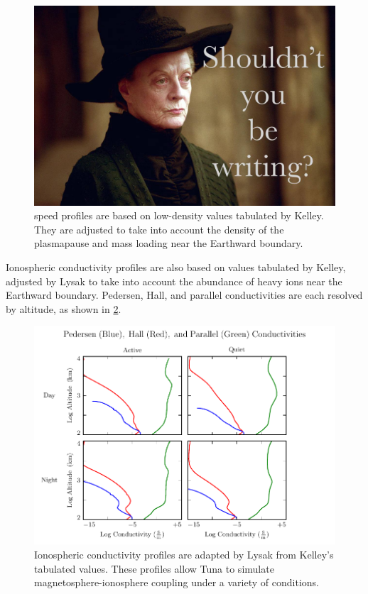 \begin{figure}[!htb]
    \centering
    \includegraphics[width=\textwidth]{figures/placeholder.jpg}
    \caption[\Alfven Speed Profiles]{
      \Alfven speed profiles are based on low-density values tabulated by Kelley\cite{kelley_1989}. They are adjusted to take into account the density of the plasmapause and mass loading near the Earthward boundary. 
    }
    \label{fig_va}
\end{figure}

Ionospheric conductivity profiles are also based on values tabulated by Kelley, adjusted by Lysak\cite{lysak_2013} to take into account the abundance of heavy ions near the Earthward boundary. Pedersen, Hall, and parallel conductivities are each resolved by altitude, as shown in \cref{fig_sigma}. 

\begin{figure}[!htb]
    \centering
    \includegraphics[width=\textwidth]{figures/sigma.pdf}
    \caption[Ionospheric Conductivity Profiles]{
      Ionospheric conductivity profiles are adapted by Lysak\cite{lysak_2013} from Kelley's tabulated values\cite{kelley_1989}. These profiles allow Tuna to simulate magnetosphere-ionosphere coupling under a variety of conditions. 
    }
    \label{fig_sigma}
\end{figure}


